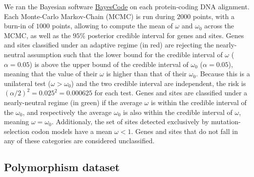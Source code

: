 \documentclass{article}
\begin{document}
    We ran the Bayesian software \href{https://github.com/bayesiancook/bayescode}{BayesCode} on each protein-coding DNA alignment\cite{lartillot_phylobayes_2013, rodrigue_detecting_2017}.
    Each Monte-Carlo Markov-Chain (MCMC) is run during $2000$ points, with a burn-in of $1000$ points, allowing to compute the mean of $\omega$ and $\omega_{0}$ across the MCMC, as well as the $95$\% posterior credible interval for genes and sites.
    Genes and sites classified under an adaptive regime (in red) are rejecting the nearly-neutral assumption such that the lower bound for the credible interval of $\omega$ ($\alpha=0.05$) is above the upper bound of the credible interval of $\omega_{0}$ ($\alpha=0.05$), meaning that the value of their $\omega$ is higher than that of their $\omega_{0}$.
    Because this is a unilateral test ($\omega > \omega_{0}$) and the two credible interval are independent, the risk is $(\alpha/2)^2=0.025^2=0.000625$ for each test.
    Genes and sites are classified under a nearly-neutral regime (in green) if the average $\omega$ is within the credible interval of the $\omega_{0}$, and respectively the average $\omega_{0}$ is also within the credible interval of  $\omega$, meaning $\omega = \omega_{0}$.
    Additionaly, the set of sites detected exclusively by mutation-selection codon models have a mean $\omega < 1 $.
    Genes and sites that do not fall in any of these categories are considered unclassified.

    \subsection*{Polymorphism dataset}
\end{document}
